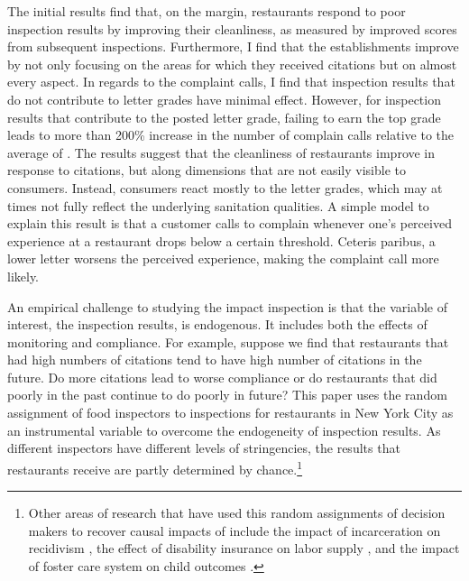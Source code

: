 \documentclass[11pt]{article}
\begin{document}
The initial results find that, on the margin, restaurants respond to poor inspection results by improving their cleanliness, as measured by improved scores from subsequent inspections. Furthermore, I find that the establishments improve by not only focusing on the areas for which they received citations but on almost every aspect. In regards to the complaint calls, I find that inspection results that do not contribute to letter grades have minimal effect. However, for inspection results that contribute to the posted letter grade, failing to earn the top grade leads to more than 200\% increase in the number of complain calls relative to the average of . The results suggest that the cleanliness of restaurants improve in response to citations, but along dimensions that are not easily visible to consumers. Instead, consumers react mostly to the letter grades, which may at times not fully reflect the underlying sanitation qualities. A simple model to explain this result is that a customer calls to complain whenever one's perceived experience at a restaurant drops below a certain threshold. Ceteris paribus, a lower letter worsens the perceived experience, making the complaint call more likely. 

An empirical challenge to studying the impact inspection is that the variable of interest, the inspection results, is endogenous. It includes both the effects of monitoring and compliance. For example, suppose we find that restaurants that had high numbers of citations tend to have high number of citations in the future. Do more citations lead to worse compliance or do restaurants that did poorly in the past continue to do poorly in future? This paper uses the random assignment of food inspectors to inspections for restaurants in New York City as an instrumental variable to overcome the endogeneity of inspection results. As different inspectors have different levels of stringencies, the results that restaurants receive are partly determined by chance.\footnote{Other areas of research that have used this random assignments of decision makers to recover causal impacts of include the impact of incarceration on recidivism \citep{bhuller_16}, the effect of disability insurance on labor supply \citep{Maestas_13}, and the impact of foster care system on child outcomes \citep{Doyle_07}.}
\end{document}
